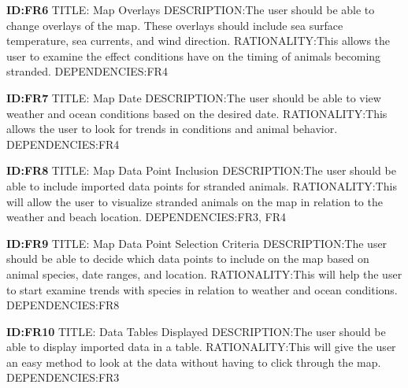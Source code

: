 \documentclass[onecolumn, draftclsnofoot,10pt, compsoc]{IEEEtran}
\begin{document}
\begin{singlespace}
    \textbf{ID:FR6}\newline
    TITLE: Map Overlays\newline
    DESCRIPTION:The user should be able to change overlays of the map.  These overlays should include sea surface temperature, sea currents, and wind direction.\newline
    RATIONALITY:This allows the user to examine the effect conditions have on the timing of animals becoming stranded.\newline
    DEPENDENCIES:FR4\newline

   \textbf{ID:FR7}\newline
    TITLE: Map Date\newline
    DESCRIPTION:The user should be able to view weather and ocean conditions based on the desired date.\newline
    RATIONALITY:This allows the user to look for trends in conditions and animal behavior. \newline
    DEPENDENCIES:FR4\newline

    \textbf{ID:FR8}\newline
    TITLE: Map Data Point Inclusion\newline
    DESCRIPTION:The user should be able to include imported data points for stranded animals.\newline
    RATIONALITY:This will allow the user to visualize stranded animals on the map in relation to the weather and beach location.\newline
    DEPENDENCIES:FR3, FR4\newline

    \textbf{ID:FR9}\newline
    TITLE: Map Data Point Selection Criteria\newline
    DESCRIPTION:The user should be able to decide which data points to include on the map based on animal species, date ranges, and location.\newline
    RATIONALITY:This will help the user to start examine trends with species in relation to weather and ocean conditions.\newline
    DEPENDENCIES:FR8\newline

    \textbf{ID:FR10}\newline
    TITLE: Data Tables Displayed\newline
    DESCRIPTION:The user should be able to display imported data in a table.\newline
    RATIONALITY:This will give the user an easy method to look at the data without having to click through the map.\newline
    DEPENDENCIES:FR3\newline


\end{singlespace}
\end{document}
